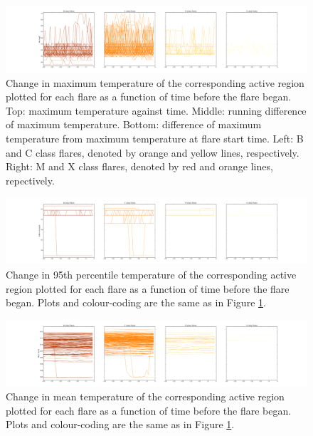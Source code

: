 \documentclass[referee,a4paper,12pt]{swsc}
\begin{document}
\begin{linenumbers}
\begin{figure}
	\centering
		\includegraphics[width=\columnwidth]{tempplotsmax/allars.png}
	\caption{Change in maximum temperature of the corresponding active region plotted for each flare as a function of time before the flare began. Top: maximum temperature against time. Middle: running difference of maximum temperature. Bottom: difference of maximum temperature from maximum temperature at flare start time. Left: B and C class flares, denoted by orange and yellow lines, respectively. Right: M and X class flares, denoted by red and orange lines, repectively.}
	\label{fig:allars_max}
\end{figure}
\begin{figure}
	\centering
		\includegraphics[width=\columnwidth]{tempplots_p95/allars.png}
	\caption{Change in 95th percentile temperature of the corresponding active region plotted for each flare as a function of time before the flare began. Plots and colour-coding are the same as in Figure \ref{fig:allars_max}.}
	\label{fig:allars_p95}
\end{figure}
\begin{figure}
	\centering
		\includegraphics[width=\columnwidth]{tempplotsmean/allars.png}
	\caption{Change in mean temperature of the corresponding active region plotted for each flare as a function of time before the flare began. Plots and colour-coding are the same as in Figure \ref{fig:allars_max}.}
	\label{fig:allars_mean}
\end{figure}

\end{linenumbers}
\end{document}
